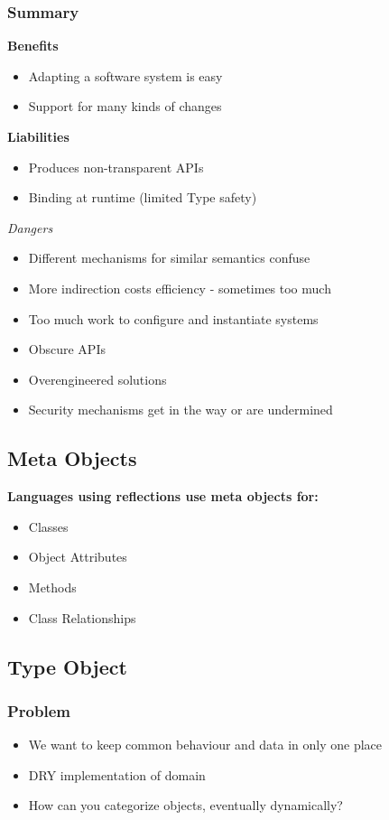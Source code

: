 \subsubsection{Summary}
\textbf{Benefits}
\begin{itemize}[topsep=0pt]
    \itemsep -0.4em
    \item Adapting a software system is easy
    \item Support for many kinds of changes
\end{itemize}
\textbf{Liabilities}
\begin{itemize}[topsep=0pt]
    \itemsep -0.4em
    \item Produces non-transparent APIs
    \item Binding at runtime (limited Type safety)
\end{itemize}
\textit{Dangers}
\begin{itemize}[topsep=0pt]
    \itemsep -0.4em
    \item Different mechanisms for similar semantics confuse
    \item More indirection costs efficiency - sometimes too much
    \item Too much work to configure and instantiate systems
    \item Obscure APIs
    \item Overengineered solutions
    \item Security mechanisms get in the way or are undermined
\end{itemize}

\subsection{Meta Objects}
\textbf{Languages using reflections use meta objects for:}
\begin{itemize}[topsep=0pt]
    \itemsep -0.4em
    \item Classes
    \item Object Attributes
    \item Methods
    \item Class Relationships
\end{itemize}

\subsection{Type Object}
\subsubsection{Problem}
\begin{itemize}[topsep=0pt]
    \itemsep -0.4em
    \item We want to keep common behaviour and data in only one place
    \item DRY implementation of domain
    \item How can you categorize objects, eventually dynamically?
\end{itemize}
